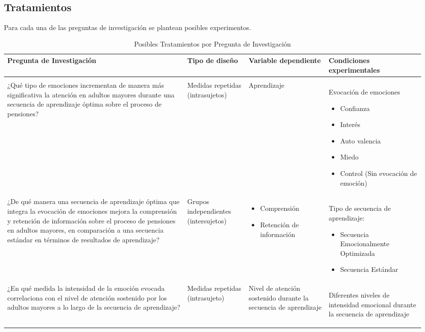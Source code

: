 \subsection{Tratamientos}
Para cada una de las preguntas de investigación se plantean posibles experimentos. 
\begin{longtable}{| m{5cm} | m{2cm} | m{3cm} | m{5cm} |}
\caption{Posibles Tratamientos por Pregunta de Investigación } \label{tab: tratamiento}\\
\hline
\textbf{Pregunta de Investigación} & \textbf{Tipo de diseño} & \textbf{Variable dependiente} &\textbf{Condiciones experimentales} \\ \hline
\endfirsthead
\hline
\\¿Qué tipo de emociones incrementan de manera más significativa la atención en adultos mayores durante una secuencia de aprendizaje óptima sobre el proceso de pensiones? & Medidas repetidas (intrasujetos) & Aprendizaje & Evocación de emociones \begin{itemize}
    \item Confianza
    \item Interés
    \item Auto valencia
    \item Miedo
    \item Control (Sin evocación de emoción) 
\end{itemize} \\ \hline
¿De qué manera una secuencia de aprendizaje óptima que integra la evocación de emociones mejora la comprensión y retención de información sobre el proceso de pensiones en adultos mayores, en comparación a una secuencia estándar en términos de resultados de aprendizaje? & Grupos independientes (intersujetos) & \begin{itemize}
    \item Comprensión
    \item Retención de información 
\end{itemize} & Tipo de secuencia de aprendizaje: \begin{itemize}
    \item Secuencia Emocionalmente Optimizada
    \item Secuencia Estándar 
\end{itemize} \\ \hline
¿En qué medida la intensidad de la emoción evocada correlaciona con el nivel de atención sostenido por los adultos mayores a lo largo de la secuencia de aprendizaje? & Medidas repetidas (intrasujeto) & Nivel de atención sostenido durante la secuencia de aprendizaje & Diferentes niveles de intensidad emocional durante la secuencia de aprendizaje\begin{itemize}

\end{itemize}
\end{longtable}
